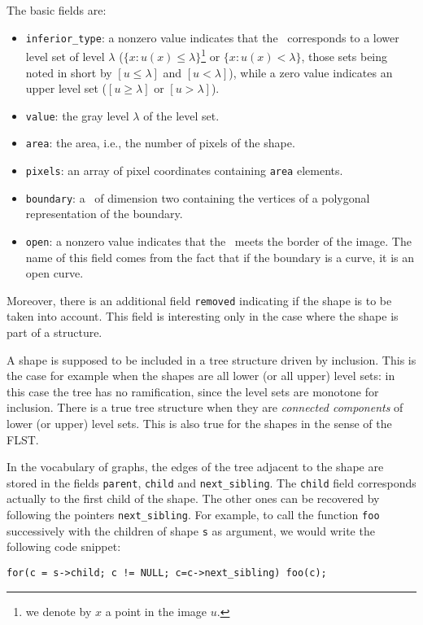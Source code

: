 The basic fields are:
\begin{itemize}
\item \verb+inferior_type+: a nonzero value indicates that the \shape\
corresponds to a lower level set of level $\lambda$ ($\{x : u(x) \leq \lambda\}$\footnote{we denote by $x$ a point in the image $u$.} or 
$\{x : u(x) < \lambda\}$, those sets being noted in short by
$[u \leq \lambda]$ and $[u<\lambda]$),
while a zero value indicates an upper level set ($[u\geq \lambda]$ or $[u>\lambda]$).
\item \verb+value+: the gray level $\lambda$ of the level set.
\item \verb+area+: the area, i.e., the number of pixels of the shape.
\item \verb+pixels+: an array of pixel coordinates containing \verb+area+
elements.
\item \verb+boundary+: a \flist\ of dimension two containing the
vertices of a polygonal representation of the boundary.
\item \verb+open+: a nonzero value indicates that the \shape\ meets
the border of the image. The name of this field comes from the fact that if
the boundary is a curve, it is an open curve.
\end{itemize}
Moreover, there is an additional field \verb+removed+ indicating if the
shape is to be taken into account. This field is interesting only in the case
where the shape is part of a structure.

A shape is supposed to be included in a tree structure driven by
inclusion. This is the case for example when the shapes are all lower (or all
upper) level sets: in this case the tree has no ramification, since the level
sets are monotone for inclusion. There is a true tree structure when they are
{\em connected components} of lower (or upper) level sets. This is also true
for the shapes in the sense of the FLST.

In the vocabulary of graphs, the edges of the tree adjacent to the shape are
stored in the fields \verb+parent+, \verb+child+ and
\verb+next_sibling+. The \verb+child+ field corresponds actually to the
first child of the shape. The other ones can be recovered by following the
pointers \verb+next_sibling+. For example, to call the function \verb+foo+
successively with the children of shape \verb+s+ as argument, we would write
the following code snippet:\par
\verb+for(c = s->child; c != NULL; c=c->next_sibling) foo(c);+

